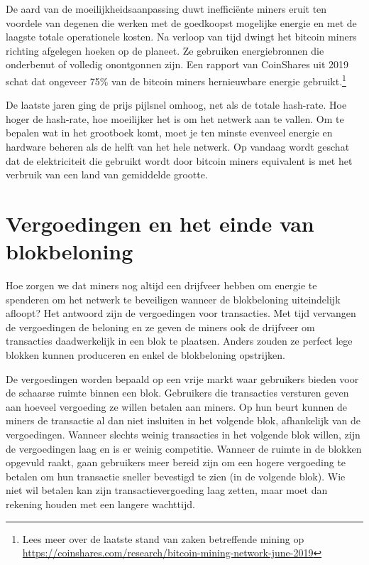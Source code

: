 \documentclass[
  letterpaper,
]{scrbook}
\begin{document}
De aard van de moeilijkheidsaanpassing duwt inefficiënte miners eruit
ten voordele van degenen die werken met de goedkoopst mogelijke energie
en met de laagste totale operationele kosten. Na verloop van tijd dwingt
het bitcoin miners richting afgelegen hoeken op de planeet. Ze gebruiken
energiebronnen die onderbenut of volledig onontgonnen zijn. Een rapport
van CoinShares uit 2019 schat dat ongeveer 75\% van de bitcoin miners
hernieuwbare energie gebruikt.\footnote{Lees meer over de laatste stand
  van zaken betreffende mining op
  \url{https://coinshares.com/research/bitcoin-mining-network-june-2019}}

De laatste jaren ging de prijs pijlsnel omhoog, net als de totale
hash-rate. Hoe hoger de hash-rate, hoe moeilijker het is om het netwerk
aan te vallen. Om te bepalen wat in het grootboek komt, moet je ten
minste evenveel energie en hardware beheren als de helft van het hele
netwerk. Op vandaag wordt geschat dat de elektriciteit die gebruikt
wordt door bitcoin miners equivalent is met het verbruik van een land
van gemiddelde grootte.

\hypertarget{vergoedingen-en-het-einde-van-blokbeloning}{%
\section{Vergoedingen en het einde van
blokbeloning}\label{vergoedingen-en-het-einde-van-blokbeloning}}

Hoe zorgen we dat miners nog altijd een drijfveer hebben om energie te
spenderen om het netwerk te beveiligen wanneer de blokbeloning
uiteindelijk afloopt? Het antwoord zijn de vergoedingen voor
transacties. Met tijd vervangen de vergoedingen de beloning en ze geven
de miners ook de drijfveer om transacties daadwerkelijk in een blok te
plaatsen. Anders zouden ze perfect lege blokken kunnen produceren en
enkel de blokbeloning opstrijken.

De vergoedingen worden bepaald op een vrije markt waar gebruikers bieden
voor de schaarse ruimte binnen een blok. Gebruikers die transacties
versturen geven aan hoeveel vergoeding ze willen betalen aan miners. Op
hun beurt kunnen de miners de transactie al dan niet insluiten in het
volgende blok, afhankelijk van de vergoedingen. Wanneer slechts weinig
transacties in het volgende blok willen, zijn de vergoedingen laag en is
er weinig competitie. Wanneer de ruimte in de blokken opgevuld raakt,
gaan gebruikers meer bereid zijn om een hogere vergoeding te betalen om
hun transactie sneller bevestigd te zien (in de volgende blok). Wie niet
wil betalen kan zijn transactievergoeding laag zetten, maar moet dan
rekening houden met een langere wachttijd.
\end{document}
